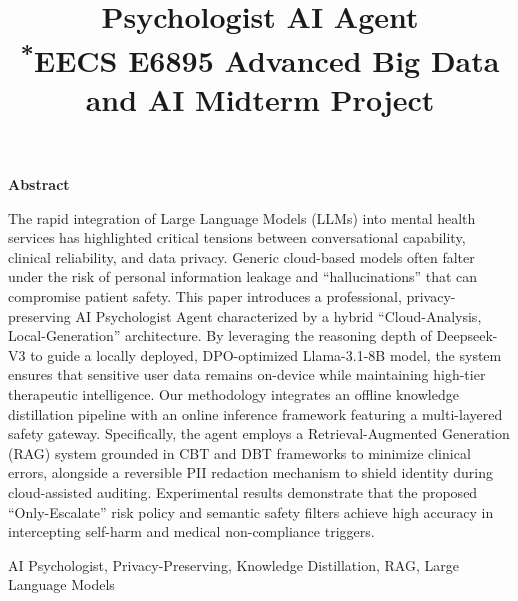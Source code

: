 \documentclass[conference]{IEEEtran}
\begin{document}
\title{Psychologist AI Agent\\
{\footnotesize \textsuperscript{*}EECS E6895 Advanced Big Data and AI Midterm Project}
}

\author{
    \and
    \and
}

\maketitle

\begin{center}
    \textbf{\large Abstract}
\end{center}
\noindent The rapid integration of Large Language Models (LLMs) into mental health services has highlighted critical tensions between conversational capability, clinical reliability, and data privacy. Generic cloud-based models often falter under the risk of personal information leakage and ``hallucinations'' that can compromise patient safety. This paper introduces a professional, privacy-preserving AI Psychologist Agent characterized by a hybrid ``Cloud-Analysis, Local-Generation'' architecture. By leveraging the reasoning depth of Deepseek-V3 to guide a locally deployed, DPO-optimized Llama-3.1-8B model, the system ensures that sensitive user data remains on-device while maintaining high-tier therapeutic intelligence. Our methodology integrates an offline knowledge distillation pipeline with an online inference framework featuring a multi-layered safety gateway. Specifically, the agent employs a Retrieval-Augmented Generation (RAG) system grounded in CBT and DBT frameworks to minimize clinical errors, alongside a reversible PII redaction mechanism to shield identity during cloud-assisted auditing. Experimental results demonstrate that the proposed ``Only-Escalate'' risk policy and semantic safety filters achieve high accuracy in intercepting self-harm and medical non-compliance triggers.

\begin{IEEEkeywords}
AI Psychologist, Privacy-Preserving, Knowledge Distillation, RAG, Large Language Models
\end{IEEEkeywords}
\end{document}
